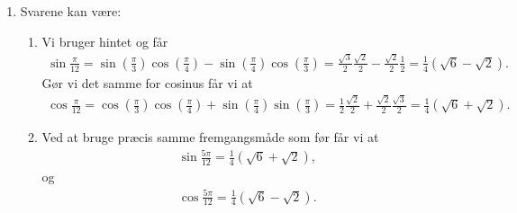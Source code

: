 \begin{enumerate}

	\item \label{it:trig5} Svarene kan være:
	\begin{enumerate}
		\item Vi bruger hintet og får
		\begin{align*}
		\sin\frac{\pi}{12}=\sin(\frac{\pi}{3})\cos(\frac{\pi}{4})-\sin(\frac{\pi}{4})\cos(\frac{\pi}{3})=\frac{\sqrt{3}}{2}\frac{\sqrt{2}}{2}-\frac{\sqrt{2}}{2}\frac{1}{2}=\frac{1}{4}(\sqrt{6}- \sqrt{2}).
		\end{align*}
		Gør vi det samme for cosinus får vi at
		\begin{align*}
		\cos \frac{\pi}{12}=\cos(\frac{\pi}{3})\cos(\frac{\pi}{4})+\sin(\frac{\pi}{4})\sin(\frac{\pi}{3})=\frac{1}{2}\frac{\sqrt{2}}{2}+\frac{\sqrt{2}}{2}\frac{\sqrt{3}}{2}=\frac{1}{4}(\sqrt{6}+ \sqrt{2}).
		\end{align*}
		
		\item Ved at bruge præcis samme fremgangsmåde som før får vi at 
		\begin{align*}
		\sin \frac{5\pi}{12}=\frac{1}{4}(\sqrt{6}+ \sqrt{2}),
		\end{align*}
		og 
		\begin{align*}
		\cos \frac{5\pi}{12}=\frac{1}{4}(\sqrt{6}- \sqrt{2}).
		\end{align*}
	\end{enumerate}
	

\end{enumerate}
